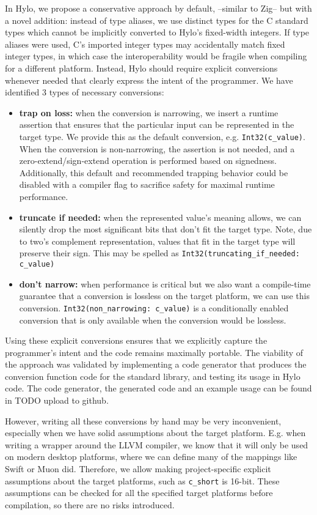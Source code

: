In Hylo, we propose a conservative approach by default, --similar to Zig-- but with a novel addition: instead of type aliases, we use distinct types for the C standard types which cannot be implicitly converted to Hylo's fixed-width integers. If type aliases were used, C's imported integer types may accidentally match fixed integer types, in which case the interoperability would be fragile when compiling for a different platform. Instead, Hylo should require explicit conversions whenever needed that clearly express the intent of the programmer. We have identified 3 types of necessary conversions:
\begin{itemize}
    \item \textbf{trap on loss:} when the conversion is narrowing, we insert a runtime assertion that ensures that the particular input can be represented in the target type. We provide this as the default conversion, e.g. \texttt{Int32(c\_value)}. When the conversion is non-narrowing, the assertion is not needed, and a zero-extend/sign-extend operation is performed based on signedness. Additionally, this default and recommended trapping behavior could be disabled with a compiler flag to sacrifice safety for maximal runtime performance.
    \item \textbf{truncate if needed:} when the represented value's meaning allows, we can silently drop the most significant bits that don't fit the target type. Note, due to two's complement representation, values that fit in the target type will preserve their sign. This may be spelled as \texttt{Int32(truncating\_if\_needed: c\_value)}
    \item \textbf{don't narrow:} when performance is critical but we also want a compile-time guarantee that a conversion is lossless on the target platform, we can use this conversion. \texttt{Int32(non\_narrowing: c\_value)} is a conditionally enabled conversion that is only available when the conversion would be lossless.
\end{itemize}
Using these explicit conversions ensures that we explicitly capture the programmer's intent and the code remains maximally portable. The viability of the approach was validated by implementing a code generator that produces the conversion function code for the standard library, and testing its usage in Hylo code. The code generator, the generated code and an example usage can be found in TODO upload to github.


However, writing all these conversions by hand may be very inconvenient, especially when we have solid assumptions about the target platform. E.g. when writing a wrapper around the LLVM compiler, we know that it will only be used on modern desktop platforms, where we can define many of the mappings like Swift or Muon did. Therefore, we allow making project-specific explicit assumptions about the target platforms, such as \texttt{c\_short} is 16-bit. These assumptions can be checked for all the specified target platforms before compilation, so there are no risks introduced.


